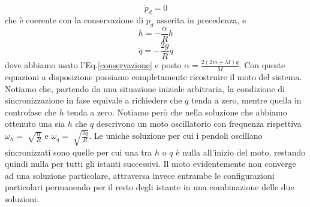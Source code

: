 \documentclass[11pt, a4paper, twoside]{article}
\begin{document}
\begin{equation}
  \dot p_d = 0
  \label{conservazione}
\end{equation}
che è coerente con la conservazione di $p_d$ asserita in precedenza, e
\begin{equation}
  \ddot h = -\frac{\alpha}{R} h
\end{equation} 
\begin{equation}
   \ddot q = - \frac{2 g}{R} q
\end{equation}
dove abbiamo usato l'Eq.\ref{conservazione} e posto $\alpha = \frac{2 (2m + M) g}{M} $.
Con queste equazioni a disposizione possiamo completamente ricostruire il moto del sistema.
Notiamo che, partendo da una situazione iniziale arbitraria,
la condizione di sincronizzazione in fase equivale a richiedere che $q$ tenda a zero, mentre quella in controfase
che $h$ tenda a zero. 
Notiamo però che nella soluzione che abbiamo ottenuto una sia $h$ che $q$ descrivono un moto oscillatorio con frequenza rispettiva
$\omega_h = \sqrt[]{\frac{\alpha}{R}}$ e $\omega_q = \sqrt[]{\frac{2g}{R}}$.
Le uniche soluzione per cui i pendoli oscillano sincronizzati sono quelle per cui una tra $h$ o $q$ è nulla
all'inizio del moto, restando quindi nulla per tutti gli istanti successivi.
Il moto evidentemente non converge ad una soluzione particolare, attraversa invece entrambe le configurazioni particolari 
permanendo per il resto degli istante in una combinazione delle due soluzioni.
\end{document}
